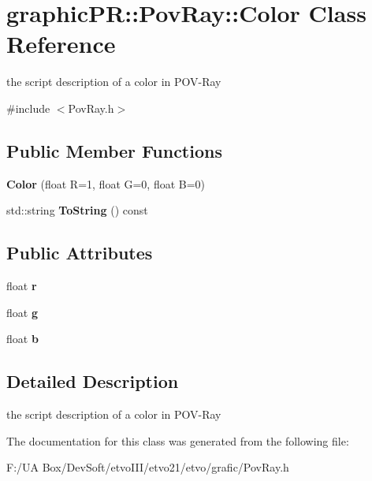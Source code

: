 \section{graphic\+PR\+:\+:Pov\+Ray\+:\+:Color Class Reference}
\label{classgraphic_p_r_1_1_pov_ray_1_1_color}


the script description of a color in P\+O\+V-\/\+Ray  




{\ttfamily \#include $<$Pov\+Ray.\+h$>$}

\subsection*{Public Member Functions}
\begin{DoxyCompactItemize}
\item 
\mbox{\label{classgraphic_p_r_1_1_pov_ray_1_1_color_a512ecacfb3419bbc9e62734ffb240db5}} 
{\bfseries Color} (float R=1, float G=0, float B=0)
\item 
\mbox{\label{classgraphic_p_r_1_1_pov_ray_1_1_color_a9a03c2efc4c4c744dca662c71efdd1dd}} 
std\+::string {\bfseries To\+String} () const
\end{DoxyCompactItemize}
\subsection*{Public Attributes}
\begin{DoxyCompactItemize}
\item 
\mbox{\label{classgraphic_p_r_1_1_pov_ray_1_1_color_a10588d9ffb0a0eab116f95775ab8493f}} 
float {\bfseries r}
\item 
\mbox{\label{classgraphic_p_r_1_1_pov_ray_1_1_color_ad745104824d5605c219774a8308b2e84}} 
float {\bfseries g}
\item 
\mbox{\label{classgraphic_p_r_1_1_pov_ray_1_1_color_a162d9450db02ab1126bd92ade6c3e36e}} 
float {\bfseries b}
\end{DoxyCompactItemize}


\subsection{Detailed Description}
the script description of a color in P\+O\+V-\/\+Ray 

The documentation for this class was generated from the following file\+:\begin{DoxyCompactItemize}
\item 
F\+:/\+U\+A Box/\+Dev\+Soft/etvo\+I\+I\+I/etvo21/etvo/grafic/Pov\+Ray.\+h\end{DoxyCompactItemize}
